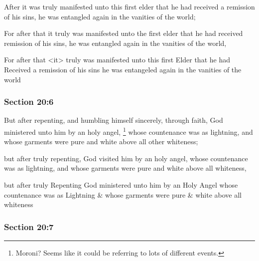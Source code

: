 		After it was truly manifested unto this first elder that he had received a remission of his sins, he was entangled again in the vanities of the world;

		\begin{framed}
		\scriptsize
			\begin{compactdesc}
				\item[JSP] For after that it truly was manifested unto the first elder that he had received remission of his sins, he was entangled again in the vanities of the world,
				\item[RB1] For after that <it> truly was manifested unto this first Elder that he had Received a remission of his sins he was entangeled again in the vanities of the world
			\end{compactdesc}
		\end{framed}

	\subsubsection{Section 20:6} %
		\label{DC20-6}

		But after repenting, and humbling himself sincerely, through faith, God ministered unto him by an holy angel,%
		\footnote{%
			Moroni? Seems like it could be referring to lots of different events.
			} 
		whose countenance was as lightning, and whose garments were pure and white above all other whiteness;

		\begin{framed}
		\scriptsize
			\begin{compactdesc}
				\item[JSP] but after truly repenting, God visited him by an holy angel, whose countenance was as lightning, and whose garments were pure and white above all whiteness,
				\item[RB1] but after truly Repenting God ministered unto him by an Holy Angel whose countenance was as Lightning \& whose garments were pure \& white above all whiteness
			\end{compactdesc}
		\end{framed}

	\subsubsection{Section 20:7} %
		\label{DC20-7}

